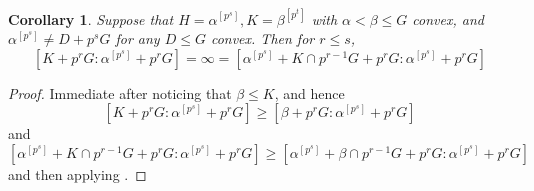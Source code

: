 \documentclass[a4paper,11pt]{article}
\newtheorem{corollary}[theorem]{Corollary}
\begin{document}
\begin{corollary}\label{[b^p^s :a^p^s] infinite}
	Suppose that $H = \alpha^{[p^s]}, K = \beta^{[p^t]}$ with $\alpha < \beta \leq G$ convex, and $\alpha^{[p^s]}\neq D+p^sG$ for any $D\leq G$ convex. Then for $r\leq s$, $$[K+p^rG:\alpha^{[p^s]}+p^rG] =\infty = [\alpha^{[p^s]}+K\cap p^{r-1}G+p^rG:\alpha^{[p^s]}+p^rG] $$
\end{corollary}
\begin{proof}
	Immediate after noticing that $\beta\leq K$, and hence$$[K+p^rG:\alpha^{[p^s]}+p^rG]\geq [\beta+p^rG:\alpha^{[p^s]}+p^rG]$$ and $$[\alpha^{[p^s]}+K\cap p^{r-1}G+p^rG:\alpha^{[p^s]}+p^rG]\geq [\alpha^{[p^s]}+\beta \cap p^{r-1}G+p^rG:\alpha^{[p^s]}+p^rG]$$ and then applying .
\end{proof}
\end{document}
